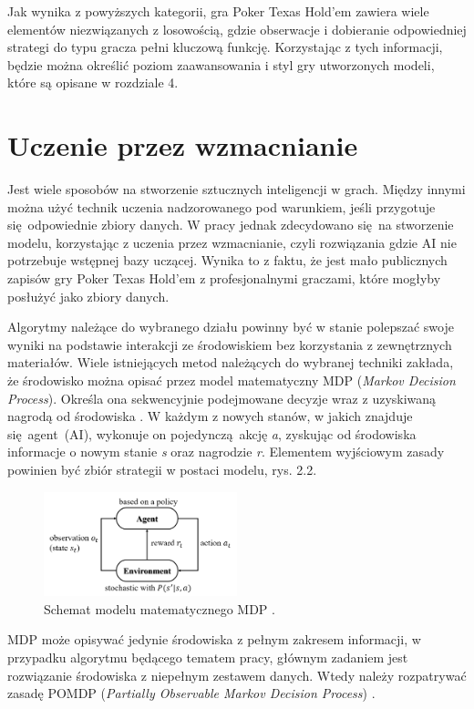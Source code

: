 \documentclass[12pt,oneside,a4paper]{report}
\begin{document}
Jak wynika z powyższych kategorii, gra Poker Texas Hold'em zawiera wiele elementów niezwiązanych z
losowością, gdzie obserwacje i dobieranie odpowiedniej strategi do typu gracza pełni kluczową
funkcję. Korzystając z tych informacji, będzie można określić poziom zaawansowania i styl gry
utworzonych modeli,
które są opisane w rozdziale 4.

\section{Uczenie przez wzmacnianie}

Jest wiele sposobów na stworzenie sztucznych inteligencji w grach. Między innymi można użyć technik 
uczenia
nadzorowanego pod warunkiem, jeśli przygotuje się odpowiednie zbiory danych. W pracy jednak
zdecydowano się na stworzenie modelu, korzystając z uczenia przez wzmacnianie, czyli rozwiązania gdzie
AI nie potrzebuje wstępnej bazy uczącej. Wynika to z faktu, że jest mało publicznych zapisów
gry Poker Texas Hold'em z profesjonalnymi graczami, które mogłyby posłużyć jako zbiory danych.


Algorytmy należące do
wybranego działu powinny być w stanie polepszać swoje wyniki na podstawie interakcji ze
środowiskiem bez korzystania z zewnętrznych materiałów.  
Wiele istniejących metod należących do wybranej techniki zakłada, że środowisko można opisać
przez model
matematyczny
MDP (\emph{Markov Decision Process}). 
Określa ona sekwencyjnie podejmowane decyzje wraz z uzyskiwaną nagrodą od środowiska \cite{mdp}. W każdym z nowych
stanów, w
jakich znajduje się agent (AI), wykonuje on pojedynczą akcję \emph{a}, 
zyskując od środowiska informacje o nowym stanie \emph{s}
oraz nagrodzie \emph{r}. Elementem wyjściowym zasady powinien być
zbiór strategii w postaci modelu, rys. 2.2.


\begin{figure}[th!]
            \center
           \includegraphics[width=0.5\textwidth]{./img/MDP.png}
           \caption{Schemat modelu matematycznego MDP \cite{mdp}.}
\end{figure}


MDP może opisywać jedynie środowiska z pełnym zakresem informacji, w przypadku algorytmu będącego
tematem pracy, głównym zadaniem jest rozwiązanie środowiska z niepełnym zestawem danych. Wtedy 
należy rozpatrywać zasadę POMDP (\emph{Partially Observable Markov Decision Process}) \cite{mdp}.
\end{document}
